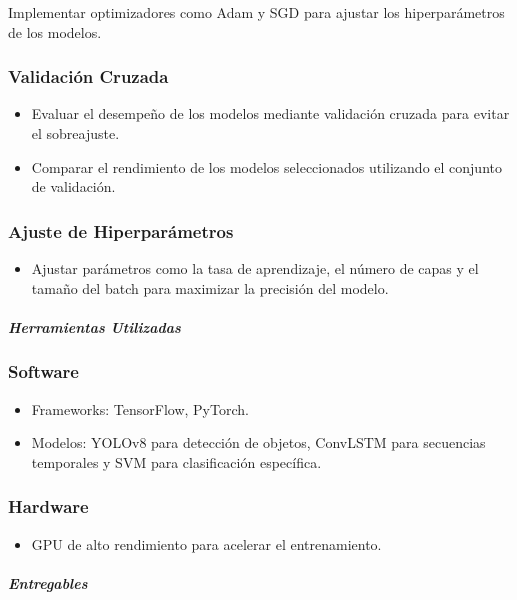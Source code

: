 Implementar optimizadores como Adam y SGD para ajustar los hiperparámetros de los modelos.

\subsubsection{Validación Cruzada}
\begin{itemize}
    \item Evaluar el desempeño de los modelos mediante validación cruzada para evitar el sobreajuste.
    \item Comparar el rendimiento de los modelos seleccionados utilizando el conjunto de validación.
\end{itemize}

\subsubsection{Ajuste de Hiperparámetros}
\begin{itemize}
    \item Ajustar parámetros como la tasa de aprendizaje, el número de capas y el tamaño del batch para maximizar la precisión del modelo.
\end{itemize}


\paragraph{\textit{Herramientas Utilizadas}}

\subsubsection{Software}
\begin{itemize}
    \item Frameworks: TensorFlow, PyTorch.
    \item Modelos: YOLOv8 para detección de objetos, ConvLSTM para secuencias temporales y SVM para clasificación específica.
\end{itemize}

\subsubsection{Hardware}
\begin{itemize}
    \item GPU de alto rendimiento para acelerar el entrenamiento.
\end{itemize}

\paragraph{\textit{Entregables}}

